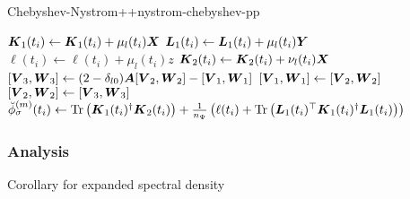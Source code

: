 \documentclass[12pt]{article}
\begin{document}
\begin{algo}{Chebyshev-Nystrom++}{nystrom-chebyshev-pp}
\begin{algorithmic}[1]
            \State $\boldsymbol{K}_1(t_i) \gets \boldsymbol{K}_1(t_i) + \mu_l(t_i) \boldsymbol{X}$ 
            \State $\boldsymbol{L}_1(t_i) \gets \boldsymbol{L}_1(t_i) + \mu_l(t_i) \boldsymbol{Y}$ 
            \State $\ell(t_i) \gets \ell(t_i) + \mu_l(t_i) z$ 
        \EndIf
        \State $\boldsymbol{K}_2(t_i) \gets \boldsymbol{K}_2(t_i) + \nu_l(t_i) \boldsymbol{X}$ 
      \EndFor
      \State $[\boldsymbol{V}_3, \boldsymbol{W}_3] \gets (2 - \delta_{l0}) \boldsymbol{A} [\boldsymbol{V}_2, \boldsymbol{W}_2] - [\boldsymbol{V}_1, \boldsymbol{W}_1]$ 
      \State $[\boldsymbol{V}_1, \boldsymbol{W}_1] \gets [\boldsymbol{V}_2, \boldsymbol{W}_2]$
      \State $[\boldsymbol{V}_2, \boldsymbol{W}_2] \gets [\boldsymbol{V}_3, \boldsymbol{W}_3]$
    \EndFor
      \State $\breve{\phi}_{\sigma}^{(m)}(t_i) \gets \operatorname{Tr}\left( \boldsymbol{K}_1(t_i)^{\dagger}\boldsymbol{K}_2(t_i) \right) + \frac{1}{n_{\Psi}} \left( \ell(t_i) + \operatorname{Tr}\left( \boldsymbol{L}_1(t_i)^{\top} \boldsymbol{K}_1(t_i)^{\dagger} \boldsymbol{L}_1(t_i) \right)  \right) $ \label{lin:4-nystromchebyshev-nystrom-pp}
    \EndFor
\end{algorithmic}
\end{algo}

\subsubsection{Analysis}
\label{subsubsec:chebyshev-nystrom-analysis}

Corollary for expanded spectral density
\end{document}
